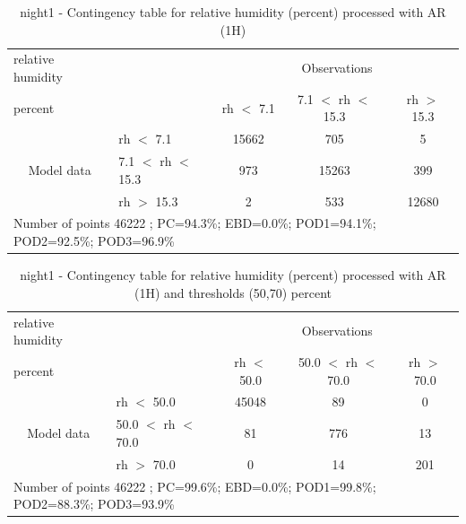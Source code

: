 \begin{table}[p!]
\begin{center}
\begin{tabular}{llccc}
\hline
{relative humidity}                                       &                                                    & \multicolumn{3}{c}{Observations}                 \\
{percent}                                       &                             & rh $<$ 7.1   & 7.1 $<$ rh $<$ 15.3 & rh $>$ 15.3 \\
\hline
\multicolumn{1}{c}{\multirow{3}{*}{Model data}}  & rh $<$ 7.1             & 15662                & 705                       & 5              \\
                                                 & 7.1  $<$ rh $<$ 15.3 & 973                & 15263                       & 399              \\
                                                 & rh $>$ 15.3             & 2                & 533                       & 12680              \\
\hline
\multicolumn{5}{l}{ Number of points        46222 ; PC=94.3\%; EBD=0.0\%; POD1=94.1\%; POD2=92.5\%; POD3=96.9\%}
\end{tabular}
\end{center}
\caption{night1 - Contingency table for  relative humidity (percent) processed with AR (1H)}
\label{tab:contingencyrhAFT:night1}
\end{table}
\begin{table}[p!]
\begin{center}
\begin{tabular}{llccc}
\hline
{relative humidity}                                       &                                                    & \multicolumn{3}{c}{Observations}                 \\
{percent}                                       &                             & rh $<$ 50.0   & 50.0 $<$ rh $<$ 70.0 & rh $>$ 70.0 \\
\hline
\multicolumn{1}{c}{\multirow{3}{*}{Model data}}  & rh $<$ 50.0             & 45048                & 89                       & 0              \\
                                                 & 50.0  $<$ rh $<$ 70.0 & 81                & 776                       & 13              \\
                                                 & rh $>$ 70.0             & 0                & 14                       & 201              \\
\hline
\multicolumn{5}{l}{ Number of points        46222 ; PC=99.6\%; EBD=0.0\%; POD1=99.8\%; POD2=88.3\%; POD3=93.9\%}
\end{tabular}
\end{center}
\caption{night1 - Contingency table for  relative humidity (percent) processed with AR (1H) and thresholds (50,70) percent}
\label{tab:contingencyrhAFT:night1}
\end{table}
